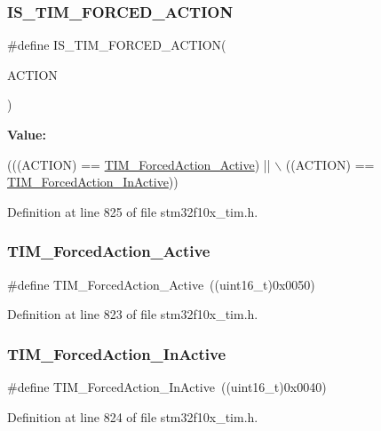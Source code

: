 \subsubsection{\texorpdfstring{I\+S\+\_\+\+T\+I\+M\+\_\+\+F\+O\+R\+C\+E\+D\+\_\+\+A\+C\+T\+I\+ON}{IS\_TIM\_FORCED\_ACTION}}
{\footnotesize\ttfamily \#define I\+S\+\_\+\+T\+I\+M\+\_\+\+F\+O\+R\+C\+E\+D\+\_\+\+A\+C\+T\+I\+ON(\begin{DoxyParamCaption}\item[{}]{A\+C\+T\+I\+ON }\end{DoxyParamCaption})}

{\bfseries Value\+:}
\begin{DoxyCode}
(((ACTION) == \hyperlink{group___t_i_m___forced___action_ga19d3769825f1dfdbdbde3edb60310b99}{TIM\_ForcedAction\_Active}) || \(\backslash\)
                                      ((ACTION) == \hyperlink{group___t_i_m___forced___action_ga79656f2193ec5e12a15d0ae5b025d273}{TIM\_ForcedAction\_InActive}))
\end{DoxyCode}


Definition at line 825 of file stm32f10x\+\_\+tim.\+h.

\mbox{\label{group___t_i_m___forced___action_ga19d3769825f1dfdbdbde3edb60310b99}} 
\subsubsection{\texorpdfstring{T\+I\+M\+\_\+\+Forced\+Action\+\_\+\+Active}{TIM\_ForcedAction\_Active}}
{\footnotesize\ttfamily \#define T\+I\+M\+\_\+\+Forced\+Action\+\_\+\+Active~((uint16\+\_\+t)0x0050)}



Definition at line 823 of file stm32f10x\+\_\+tim.\+h.

\mbox{\label{group___t_i_m___forced___action_ga79656f2193ec5e12a15d0ae5b025d273}} 
\subsubsection{\texorpdfstring{T\+I\+M\+\_\+\+Forced\+Action\+\_\+\+In\+Active}{TIM\_ForcedAction\_InActive}}
{\footnotesize\ttfamily \#define T\+I\+M\+\_\+\+Forced\+Action\+\_\+\+In\+Active~((uint16\+\_\+t)0x0040)}



Definition at line 824 of file stm32f10x\+\_\+tim.\+h.

